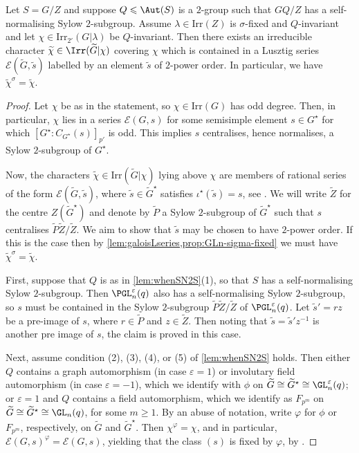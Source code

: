 \documentclass[eqthmnum, nocolour]{jt-calcs}
\newcommand{\irr}{\mathrm{Irr}}
\newcommand{\wt}[1]{\widetilde{#1}}
\renewcommand{\epsilon}{\varepsilon}
\begin{document}
\begin{proposition}\label{prop:seriesabove}
Let $S = G/Z$ and suppose $Q \leqslant \Aut(S)$ is a $2$-group such that $GQ/Z$ has a self-normalising Sylow $2$-subgroup. Assume $\lambda\in\irr(Z)$ is $\sigma$-fixed and $Q$-invariant and let $\chi\in\irr_{2'}(G|\lambda)$ be $Q$-invariant. Then there exists an irreducible character $\widetilde{\chi} \in \Irr(\widetilde{G}|\chi)$ covering $\chi$ which is contained in a Lusztig series $\mathcal{E}(\widetilde{G},\widetilde{s})$ labelled by an element $\widetilde{s}$ of $2$-power order. In particular, we have $\widetilde{\chi}^{\sigma} = \widetilde{\chi}$.
\end{proposition}

\begin{proof}
Let $\chi$ be as in the statement, so $\chi \in \irr(G)$ has odd degree. Then, in particular, $\chi$ lies in a series $\mathcal{E}(G, s)$ for some semisimple element $s \in G^\star$ for which $[G^\star : C_{G^\star}(s)]_{p'}$ is odd. This implies $s$ centralises, hence normalises, a Sylow $2$-subgroup of $G^\star$.

Now, the characters $\wt{\chi} \in \irr(\widetilde{G}|\chi)$ lying above $\chi$ are members of rational series of the form $\mathcal{E}(\widetilde{G},\widetilde{s})$, where $\widetilde{s} \in \widetilde{G}^\star$ satisfies $\iota^{\star}(\widetilde{s}) = s$, see \cite[Corollaire 9.7]{bonnafe:2006:sln}. We will write $\widetilde{Z}$ for the centre $Z(\widetilde{G}^\star)$ and denote by $\widetilde{P}$ a Sylow $2$-subgroup of $\widetilde{G}^\star$ such that $s$ centralises $\widetilde{P}\wt{Z}/\wt{Z}$. We aim to show that $\widetilde{s}$ may be chosen to have $2$-power order. If this is the case then by \cref{lem:galoisLseries,prop:GLn-sigma-fixed} we must have $\widetilde{\chi}^{\sigma} = \widetilde{\chi}$.

First, suppose that $Q$ is as in \cref{lem:whenSN2S}(1), so that $S$ has a self-normalising Sylow $2$-subgroup.  Then $\PGL^\epsilon_n(q)$ also has a self-normalising Sylow $2$-subgroup, so $s$ must be contained in the Sylow $2$-subgroup $\widetilde{P}\wt{Z}/\wt{Z}$ of $\PGL^\epsilon_n(q)$. Let $\wt{s}'=rz$ be a pre-image of $s$, where $r\in\wt{P}$ and $z\in\wt{Z}$. Then noting that $\wt{s}=\wt{s}'z^{-1}$ is another pre image of $s$, the claim is proved in this case.

Next, assume condition (2), (3), (4), or (5) of \cref{lem:whenSN2S} holds.  Then either $Q$ contains a graph automorphism (in case $\epsilon = 1$) or involutary field automorphism (in case $\epsilon = -1$), which we identify with $\phi$ on $\widetilde{G}\cong \widetilde{G}^\star\cong \GL^\epsilon_n(q)$; or $\epsilon=1$ and $Q$ contains a field automorphism, which we identify as $F_{p^m}$ on $\widetilde{G}\cong \widetilde{G}^\star\cong \GL_n(q)$, for some $m\geq 1$. By an abuse of notation, write $\varphi$ for $\phi$ or $F_{p^m}$, respectively, on $\widetilde{G}$ and $\widetilde{G}^\star$.  Then $\chi^\varphi=\chi$, and in particular, $\mathcal{E}(G,s)^\varphi=\mathcal{E}(G,s)$, yielding that the class $(s)$ is fixed by $\varphi$, by \cite[Corollary 2.4]{navarro-tiep-turull:2008:brauer-characters-with-cyclotomic}.


\end{proof}
\end{document}
